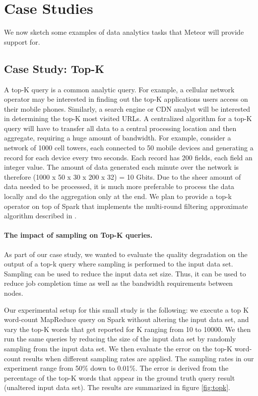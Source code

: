 \section{Case Studies}

We now sketch some examples of data analytics tasks that Meteor will provide support for. 

\subsection{Case Study: Top-K}

A top-K query is a common analytic query. For example, a cellular network operator may be interested in finding out the top-K applications users access on their mobile phones. Similarly, a search engine or CDN analyst will be interested in determining the top-K most visited URLs. 
A centralized algorithm for a top-K query will have to transfer all data to a central processing location and then aggregate, requiring a huge amount of bandwidth. For example, consider a network of 1000 cell towers, each connected to 50 mobile devices and generating a record for each device every two seconds. Each record has 200 fields, each field an integer value. The amount of data generated each minute over the network is therefore (1000 x 50 x 30 x 200 x 32) = 10 Gbits. Due to the sheer amount of data needed to be processed, it is much more preferable to process the data locally and do the aggregation only at the end. We plan to provide a top-k operator on top of Spark that implements the multi-round filtering approximate algorithm described in \cite{topk}.

\paragraph{The impact of sampling on Top-K queries.} As part of our case study, we wanted to evaluate the quality degradation on the output of a top-k query where sampling is performed to the input data set. Sampling can be used to reduce the input data set size. Thus, it can be used to reduce job completion time as well as the bandwidth requirements between nodes. 

Our experimental setup for this small study is the following: we execute a top K word-count MapReduce query on Spark without altering the input data set, and vary the top-K words that get reported for K ranging from 10 to 10000. We then run the same queries by reducing the size of the input data set by randomly sampling from the input data set. We then evaluate the error on the top-K word-count results when different sampling rates are applied. The sampling rates in our experiment range from 50\% down to 0.01\%. The error is derived from the percentage of the top-K words that appear in the ground truth query result (unaltered input data set). The results are summarized in figure \ref{fig:topk}.

